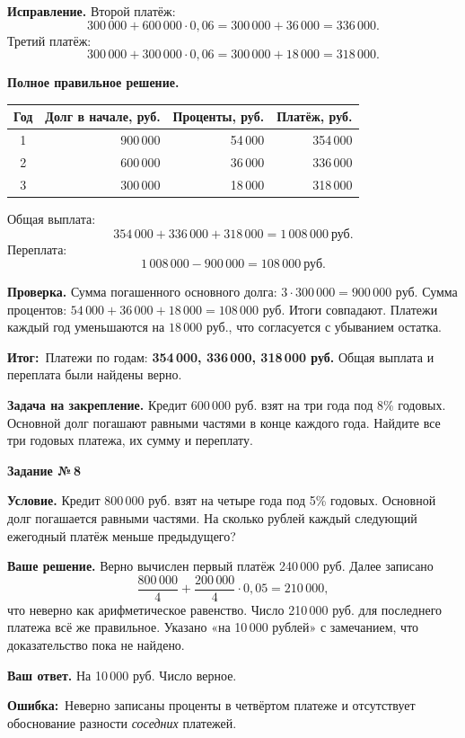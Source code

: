 \documentclass[a4paper,11pt]{article}
\newcommand{\wrong}{\textcolor{error}{\textbf{Ошибка:}}}
\newcommand{\result}{\textcolor{accent}{\textbf{Итог:}}}
\newcommand{\tasktitle}[1]{\phantomsection\label{task:#1}{\Large\color{deep}\textbf{Задание №\,#1}}\par\vspace{4mm}}
\begin{document}
\newpage
\textbf{Исправление.} Второй платёж:
\[
300\,000+600\,000\cdot0{,}06
=300\,000+36\,000=\boxed{336\,000}.
\]
Третий платёж:
\[
300\,000+300\,000\cdot0{,}06
=300\,000+18\,000=\boxed{318\,000}.
\]

\textbf{Полное правильное решение.}
\begin{center}
\small
\begin{tabular}{@{}c r r r@{}}
\toprule
Год & Долг в начале, руб. & Проценты, руб. & Платёж, руб.\\
\midrule
1 & 900\,000 & 54\,000 & 354\,000\\
2 & 600\,000 & 36\,000 & 336\,000\\
3 & 300\,000 & 18\,000 & 318\,000\\
\bottomrule
\end{tabular}
\end{center}
Общая выплата:
\[
354\,000+336\,000+318\,000=\boxed{1\,008\,000\ \text{руб.}}
\]
Переплата:
\[
1\,008\,000-900\,000=\boxed{108\,000\ \text{руб.}}
\]

\textbf{Проверка.} Сумма погашенного основного долга:
\(3\cdot300\,000=900\,000\) руб.
Сумма процентов:
\(54\,000+36\,000+18\,000=108\,000\) руб.
Итоги совпадают. Платежи каждый год уменьшаются на
\(18\,000\) руб., что согласуется с убыванием остатка.

\result\ Платежи по годам: \textbf{354\,000, 336\,000, 318\,000 руб.}
Общая выплата и переплата были найдены верно.

\textbf{Задача на закрепление.} Кредит 600\,000 руб. взят на три года
под 8\% годовых. Основной долг погашают равными частями в конце каждого
года. Найдите все три годовых платежа, их сумму и переплату.

\clearpage
\tasktitle{8}
{\textbf{Условие.}} Кредит 800\,000 руб. взят на четыре года под 5\% годовых.
Основной долг погашается равными частями. На сколько рублей
каждый следующий ежегодный платёж меньше предыдущего?

\textbf{Ваше решение.} Верно вычислен первый платёж 240\,000 руб. Далее записано
\[
\frac{800\,000}{4}+\frac{200\,000}{4}\cdot0{,}05=210\,000,
\]
что неверно как арифметическое равенство. Число 210\,000 руб. для
последнего платежа всё же правильное. Указано «на 10\,000 рублей»
с замечанием, что доказательство пока не найдено.

\textbf{Ваш ответ.} На 10\,000 руб. Число верное.

\wrong\ Неверно записаны проценты в четвёртом платеже и отсутствует
обоснование разности \emph{соседних} платежей.
\end{document}
